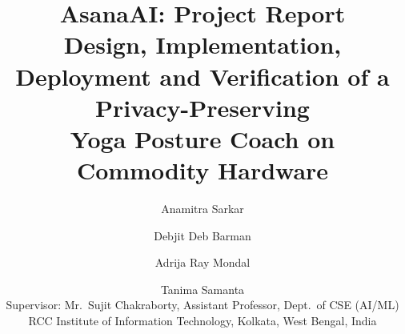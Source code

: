 \documentclass[11pt,a4paper]{article}
\begin{document}
\title{\textbf{AsanaAI: Project Report}\\[4pt]
\large Design, Implementation, Deployment and Verification of a Privacy-Preserving\\
Yoga Posture Coach on Commodity Hardware}
\author{Anamitra Sarkar \and Debjit Deb Barman \and Adrija Ray Mondal \and Tanima Samanta\\[6pt]
Supervisor: Mr.\ Sujit Chakraborty, Assistant Professor, Dept.\ of CSE (AI/ML)\\[2pt]
RCC Institute of Information Technology, Kolkata, West Bengal, India}
\date{}

\maketitle
\tableofcontents
\clearpage


















\end{document}
